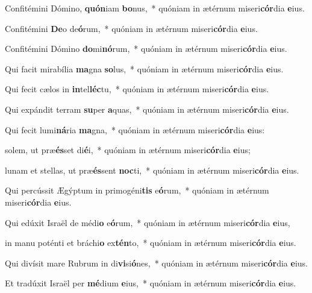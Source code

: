 \item Confitémini Dómino, \textbf{quón}iam \textbf{bo}nus,~* quóniam in ætérnum miseri\textbf{cór}dia \textbf{e}ius.

\item Confitémini \textbf{De}o de\textbf{ó}rum,~* quóniam in ætérnum miseri\textbf{cór}dia \textbf{e}ius.

\item Confitémini Dómino \textbf{do}mi\textbf{nó}rum,~* quóniam in ætérnum miseri\textbf{cór}dia \textbf{e}ius.

\item Qui facit mirabília \textbf{ma}gna \textbf{so}lus,~* quóniam in ætérnum miseri\textbf{cór}dia \textbf{e}ius.

\item Qui fecit cælos in \textbf{in}tel\textbf{léc}tu,~* quóniam in ætérnum miseri\textbf{cór}dia \textbf{e}ius.

\item Qui expándit terram \textbf{su}per \textbf{a}quas,~* quóniam in ætérnum miseri\textbf{cór}dia \textbf{e}ius.

\item Qui fecit lumi\textbf{ná}ria \textbf{ma}gna,~* quóniam in ætérnum miseri\textbf{cór}dia \textbf{e}ius:

\item solem, ut præ\textbf{és}set di\textbf{é}i,~* quóniam in ætérnum miseri\textbf{cór}dia \textbf{e}ius;

\item lunam et stellas, ut præ\textbf{és}sent \textbf{noc}ti,~* quóniam in ætérnum miseri\textbf{cór}dia \textbf{e}ius.

\item Qui percússit Ægýptum in primogéni\textbf{tis} e\textbf{ó}rum,~* quóniam in ætérnum miseri\textbf{cór}dia \textbf{e}ius.

\item Qui edúxit Israël de médi\textbf{o} e\textbf{ó}rum,~* quóniam in ætérnum miseri\textbf{cór}dia \textbf{e}ius,

\item in manu poténti et bráchi\textbf{o} ex\textbf{tén}to,~* quóniam in ætérnum miseri\textbf{cór}dia \textbf{e}ius.

\item Qui divísit mare Rubrum in di\textbf{vi}si\textbf{ó}nes,~* quóniam in ætérnum miseri\textbf{cór}dia \textbf{e}ius.

\item Et tradúxit Israël per \textbf{mé}dium \textbf{e}ius,~* quóniam in ætérnum miseri\textbf{cór}dia \textbf{e}ius.

